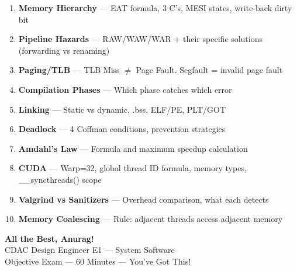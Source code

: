 \documentclass[11pt,a4paper]{article}
\begin{document}
\begin{tcolorbox}[enhanced, breakable, colback=lightred, colframe=red, boxrule=2pt, arc=6pt,
  title={\faStar\enspace HIGH PRIORITY --- Study These First}, fonttitle=\bfseries\large\color{red}]
\begin{enumerate}[leftmargin=1.5cm, itemsep=3pt]
  \item \textbf{Memory Hierarchy} --- EAT formula, 3 C's, MESI states, write-back dirty bit
  \item \textbf{Pipeline Hazards} --- RAW/WAW/WAR + their specific solutions (forwarding vs renaming)
  \item \textbf{Paging/TLB} --- TLB Miss $\neq$ Page Fault. Segfault = invalid page fault
  \item \textbf{Compilation Phases} --- Which phase catches which error
  \item \textbf{Linking} --- Static vs dynamic, .bss, ELF/PE, PLT/GOT
  \item \textbf{Deadlock} --- 4 Coffman conditions, prevention strategies
  \item \textbf{Amdahl's Law} --- Formula and maximum speedup calculation
  \item \textbf{CUDA} --- Warp=32, global thread ID formula, memory types, \_\_syncthreads() scope
  \item \textbf{Valgrind vs Sanitizers} --- Overhead comparison, what each detects
  \item \textbf{Memory Coalescing} --- Rule: adjacent threads access adjacent memory
\end{enumerate}
\end{tcolorbox}

\bigskip
\begin{center}
\begin{tcolorbox}[enhanced, colback=lightgreen, colframe=green, boxrule=2pt, arc=8pt, width=0.6\linewidth]
\begin{center}
{\Large\bfseries\color{green} All the Best, Anurag! \faThumbsUp}\\[6pt]
{\color{darkgray} CDAC Design Engineer E1 --- System Software}\\
{\color{darkgray} Objective Exam --- 60 Minutes --- You've Got This!}
\end{center}
\end{tcolorbox}
\end{center}
\end{document}
